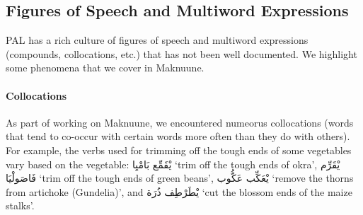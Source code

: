 %
%
%

\subsection*{Figures of Speech and Multiword Expressions}

PAL has a rich culture of figures of speech and multiword expressions (compounds, collocations, etc.) that has not been well documented. We highlight some phenomena that we  cover in Maknuune.

\paragraph{Collocations}
As part of working on Maknuune, we encountered numeorus collocations (words that tend to co-occur with certain words more often than they do  with others). For example, the verbs used for trimming off the tough ends of some vegetables vary based on the vegetable:
\foreignlanguage{arabic}{يْقَمِّع بَامْيِا} 
 `trim off the tough ends of okra', \foreignlanguage{arabic}{يْقَرِّم فَاصَولْيَا}
 `trim off the tough ends of green beans', \foreignlanguage{arabic}{يْعَكِّب عَكُّوب}
 `remove the thorns from artichoke (Gundelia)', and  \foreignlanguage{arabic}{يْطَرْطِف ذُرَة} 
 `cut the blossom ends of the maize stalks'.


